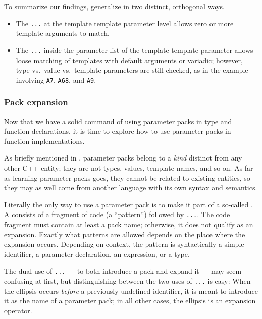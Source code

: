 To summarize our findings,  generalize
 in two distinct, orthogonal ways.
\begin{itemize}
\item{The \lstinline!...! at the template template parameter level allows zero or more template arguments to match.}
\item{The \lstinline!...! inside the parameter list of the template template parameter allows loose matching of templates with default arguments or variadic; however, type vs. value vs. template parameters are still checked, as in the example involving \lstinline!A7!, \lstinline!A68!, and \lstinline!A9!.}
\end{itemize}

\subsubsection[Pack expansion]{Pack expansion}\label{pack-expansion}

Now that we have a solid command of using parameter packs in type and
function declarations, it is time to explore how to use parameter packs
in function implementations.

As briefly mentioned in ,
parameter packs belong to a \emph{kind} distinct from any other C++
entity; they are not types, values, template names, and so on. As far as
learning parameter packs goes, they cannot be related to existing
entities, so they may as well come from another language with its own
syntax and semantics.

Literally the only way to use a parameter pack is to make it part of a
so-called . A  consists of
a fragment of code (a ``pattern'') followed by \lstinline!...!. The code
fragment must contain at least a pack name; otherwise, it does not
qualify as an expansion. Exactly what patterns are allowed depends on
the place where the expansion occurs. Depending on context, the pattern
is syntactically a simple identifier, a parameter declaration, an
expression, or a type.

The dual use of \lstinline!...! --- to both introduce a pack and expand it
--- may seem confusing at first, but distinguishing between the two uses
of \lstinline!...! is easy: When the ellipsis occurs \emph{before} a
previously undefined identifier, it is meant to introduce it as the name
of a parameter pack; in all other cases, the ellipsis is an expansion
operator.

